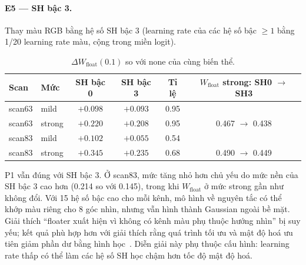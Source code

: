 \documentclass[11pt,a4paper]{article}
\begin{document}
\paragraph{E5 --- SH bậc 3.} Thay màu RGB bằng hệ số SH bậc 3 (learning rate của các hệ số bậc $\ge 1$ bằng 1/20 learning rate màu, cộng trong miền logit).
\begin{table}[H]
\centering\small
\caption{$\Delta W_{\text{float}}(0.1)$ so với none của cùng biến thể.}
\begin{tabular}{@{}llcccc@{}}
\toprule
Scan & Mức & SH bậc 0 & SH bậc 3 & Tỉ lệ & $W_{\text{float}}$ strong: SH0 $\to$ SH3 \\
\midrule
scan63 & mild & $+0.098$ & $+0.093$ & 0.95 & \\
scan63 & strong & $+0.220$ & $+0.208$ & 0.95 & 0.467 $\to$ 0.438 \\
scan83 & mild & $+0.102$ & $+0.055$ & 0.54 & \\
scan83 & strong & $+0.345$ & $+0.235$ & 0.68 & 0.490 $\to$ 0.449 \\
\bottomrule
\end{tabular}
\end{table}
P1 vẫn đúng với SH bậc 3. Ở scan83, mức tăng nhỏ hơn chủ yếu do mức nền của SH bậc 3 cao hơn (0.214 so với 0.145), trong khi $W_{\text{float}}$ ở mức strong gần như không đổi. Với 15 hệ số bậc cao cho mỗi kênh, mô hình về nguyên tắc có thể khớp màu riêng cho 8 góc nhìn, nhưng vẫn hình thành Gaussian ngoài bề mặt. Giải thích ``floater xuất hiện vì không có kênh màu phụ thuộc hướng nhìn'' bị suy yếu; kết quả phù hợp hơn với giải thích rằng quá trình tối ưu và mật độ hoá ưu tiên giảm phần dư bằng hình học~\cite{adgs}. Diễn giải này phụ thuộc cấu hình: learning rate thấp có thể làm các hệ số SH học chậm hơn tốc độ mật độ hoá.
\end{document}
